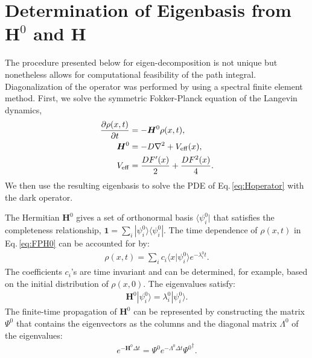\documentclass[journal=jpcbfk,manuscript=article,layout=twocolumn,articletitle=true]{achemso}
\begin{document}
\section{Determination of Eigenbasis from $\bm{H}^0$ and $\bm{H}$}

The procedure presented below for eigen-decomposition is not unique but nonetheless allows for computational feasibility of the path integral. Diagonalization of the operator was performed by using a spectral finite element method.\cite{Pozrikidis:2005vb} First, we solve the symmetric Fokker-Planck equation of the Langevin dynamics, 
\begin{align}
\label{eq:FPH0}
\frac{\partial \rho(x,t)}{\partial t} &= -\bm{H}^0 \rho(x,t), \\
\bm{H}^0 &= -D\nabla^2  + V_{\rm eff}(x), \\
V_{\rm eff}  &= \frac{DF'(x)}{2} + \frac{DF^2(x)}{4}.
\end{align}
We then use the resulting eigenbasis to solve the PDE of Eq.\,\ref{eq:Hoperator} with the dark operator. 

The Hermitian $\bm{H}^0$ gives a set of orthonormal basis $\langle \psi^0_i |$ that satisfies the completeness relationship, $\bm{1} = \sum_i | \psi^0_i \rangle \langle \psi^0_i |$. The time dependence of $\rho(x,t)$ in Eq.\,\ref{eq:FPH0} can be accounted for by:
\begin{align}
\rho(x,t) = \sum_i c_i \langle x | \psi^0_i \rangle e^{ - \lambda^0_i t }.
\end{align}
The coefficients $c_i$'s are time invariant and can be determined, for example, based on the initial distribution of $\rho(x,0)$.
The eigenvalues satisfy: 
\begin{align}
\bm{H}^0 | \psi_i^0 \rangle  = \lambda^0_i| \psi_i^0 \rangle.
\end{align}
The finite-time propagation of $\bm{H}^0$ can be represented by constructing the matrix $\Psi^0$ that contains the eigenvectors as the columns and the diagonal matrix $\Lambda^0$ of the eigenvalues:
\begin{align} 
e^{-\bm{H}^0\Delta t}  = \Psi^0 e^{-\Lambda^0\Delta t} {\Psi^0}^\dagger.
\end{align}
\end{document}
